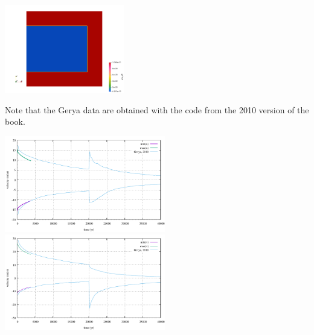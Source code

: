 \begin{center}
\includegraphics[width=5.2cm]{python_codes/fieldstone_64/results/slab/init/etaeff}
\end{center}

Note that the Gerya data are obtained with the code from the 2010 version of the book.

\begin{center}
\includegraphics[width=7cm]{python_codes/fieldstone_64/results/slab/velocity_u}
\includegraphics[width=7cm]{python_codes/fieldstone_64/results/slab/velocity_v}
\end{center}



